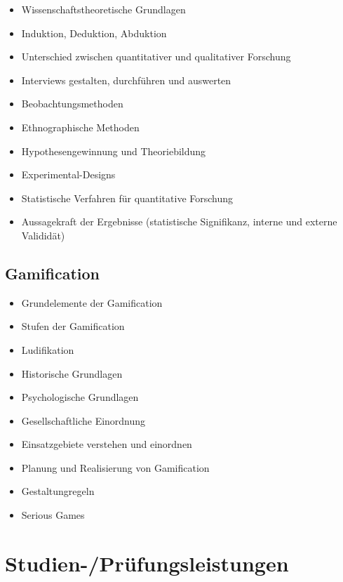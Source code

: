 \begin{itemize}
\tightlist
\item
  Wissenschaftstheoretische Grundlagen
\item
  Induktion, Deduktion, Abduktion
\item
  Unterschied zwischen quantitativer und qualitativer Forschung
\item
  Interviews gestalten, durchführen und auswerten
\item
  Beobachtungsmethoden
\item
  Ethnographische Methoden
\item
  Hypothesengewinnung und Theoriebildung
\item
  Experimental-Designs
\item
  Statistische Verfahren für quantitative Forschung
\item
  Aussagekraft der Ergebnisse (statistische Signifikanz, interne und
  externe Valididät)
\end{itemize}

\subsection*{Gamification\label{/mi-2017/modulbeschreibungen-bachelor/BA_Vertiefung_SocialComputing}}\label{gamificationpathlabelmi-2017modulbeschreibungen-bachelorbaux5fvertiefungux5fsocialcomputing-2}

\begin{itemize}
\tightlist
\item
  Grundelemente der Gamification
\item
  Stufen der Gamification
\item
  Ludifikation
\item
  Historische Grundlagen
\item
  Psychologische Grundlagen
\item
  Gesellschaftliche Einordnung
\item
  Einsatzgebiete verstehen und einordnen
\item
  Planung und Realisierung von Gamification
\item
  Gestaltungregeln
\item
  Serious Games
\end{itemize}

\section*{Studien-/Prüfungsleistungen\label{/mi-2017/modulbeschreibungen-bachelor/BA_Vertiefung_SocialComputing}}\label{studien-pruxfcfungsleistungenpathlabelmi-2017modulbeschreibungen-bachelorbaux5fvertiefungux5fsocialcomputing}

